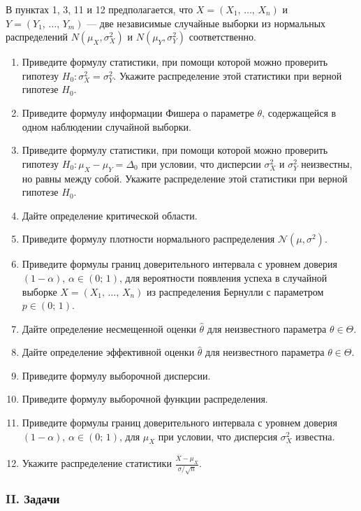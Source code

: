 \documentclass[12pt, a4paper]{article}\usepackage[]{graphicx}\usepackage[]{color}
\newcommand{\cN}{\mathcal{N}}
\begin{document}
		В пунктах 1, 3, 11 и 12 предполагается, что $X = (X_1, \, \ldots, \, X_n)$ и $Y = (Y_1, \, \ldots, \, Y_m)$ — две независимые случайные выборки из нормальных распределений $N(\mu_X, \sigma_X^2)$ и $N(\mu_Y, \sigma_Y^2)$ соответственно.

		\begin{enumerate}
			\item Приведите формулу статистики, при помощи которой можно проверить гипотезу $H_0 \colon \sigma_X^2 = \sigma_Y^2$. Укажите распределение этой статистики при верной гипотезе $H_0$.
			\item Приведите формулу информации Фишера о параметре $\theta$, содержащейся в одном наблюдении случайной выборки.
			\item Приведите формулу статистики, при помощи которой можно проверить гипотезу $H_0 \colon \mu_X - \mu_Y = \Delta_0$ при условии, что дисперсии $\sigma_X^2$ и $\sigma_Y^2$ неизвестны, но равны между собой. Укажите распределение этой статистики при верной гипотезе $H_0$.
			\item Дайте определение критической области.
			\item Приведите формулу плотности нормального распределения $\cN(\mu, \sigma^2)$.
			\item Приведите формулы границ доверительного интервала с уровнем доверия $(1 - \alpha)$, $\alpha \in (0;\,1)$, для вероятности появления успеха в случайной выборке $X = (X_1, \, \ldots, \, X_n)$ из распределения Бернулли с параметром $p \in (0;\,1)$.
			\item Дайте определение несмещенной оценки $\widehat{\theta}$ для неизвестного параметра $\theta \in \Theta$.
			\item Дайте определение эффективной оценки $\widehat{\theta}$ для неизвестного параметра $\theta \in \Theta$.
			\item Приведите формулу выборочной дисперсии.
			\item Приведите формулу выборочной функции распределения.
			\item Приведите формулы границ доверительного интервала с уровнем доверия $(1 - \alpha)$, $\alpha \in (0;\,1)$, для $\mu_X$ при условии, что дисперсия $\sigma_X^2$ известна.
			\item Укажите распределение статистики $\frac{\overline{X} - \mu_X}{\sigma / \sqrt{n}}$.
		\end{enumerate}


		\subsubsection*{II. Задачи}
\end{document}
